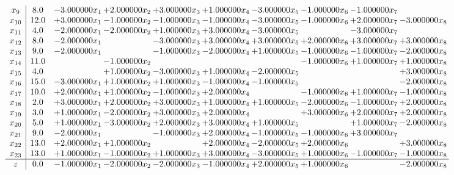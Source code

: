 \documentclass[10pt]{article}
\begin{document}
\[\begin{array}{c| c c@{\hskip 2pt} c@{\hskip 2pt} c@{\hskip 2pt} c@{\hskip 2pt} c@{\hskip 2pt} c@{\hskip 2pt} c@{\hskip 2pt} c@{\hskip 2pt} }
 x_{9}   &  8.0 & -3.000000 x_{1} & + 2.000000 x_{2} & + 3.000000 x_{3} & + 1.000000 x_{4} & -3.000000 x_{5} & -1.000000 x_{6} & -1.000000 x_{7} &   \\
 x_{10}   &  12.0 & + 3.000000 x_{1} & -1.000000 x_{2} & -1.000000 x_{3} & -1.000000 x_{4} & -3.000000 x_{5} & -1.000000 x_{6} & + 2.000000 x_{7} & -3.000000 x_{8}\\
 x_{11}   &  4.0 & -2.000000 x_{1} & -2.000000 x_{2} & + 1.000000 x_{3} & + 3.000000 x_{4} & -3.000000 x_{5} &   & -3.000000 x_{7} &   \\
 x_{12}   &  8.0 & -2.000000 x_{1} &   & -3.000000 x_{3} & + 3.000000 x_{4} & + 3.000000 x_{5} & + 2.000000 x_{6} & + 3.000000 x_{7} & + 3.000000 x_{8}\\
 x_{13}   &  9.0 & -2.000000 x_{1} &   & -1.000000 x_{3} & -2.000000 x_{4} & + 1.000000 x_{5} & -1.000000 x_{6} & -1.000000 x_{7} & -2.000000 x_{8}\\
 x_{14}   &  11.0  &   & -1.000000 x_{2} &    &    &   & -1.000000 x_{6} & + 1.000000 x_{7} & + 1.000000 x_{8}\\
 x_{15}   &  4.0  &   & + 1.000000 x_{2} & -3.000000 x_{3} & + 1.000000 x_{4} & -2.000000 x_{5} &    &   & + 3.000000 x_{8}\\
 x_{16}   &  15.0 & -3.000000 x_{1} & + 1.000000 x_{2} & + 1.000000 x_{3} & -1.000000 x_{4} & -1.000000 x_{5} &    &   & -2.000000 x_{8}\\
 x_{17}   &  10.0 & + 2.000000 x_{1} & + 1.000000 x_{2} & -1.000000 x_{3} & + 2.000000 x_{4} &   & -1.000000 x_{6} & + 1.000000 x_{7} & -1.000000 x_{8}\\
 x_{18}   &  2.0 & + 3.000000 x_{1} & + 2.000000 x_{2} & + 3.000000 x_{3} & + 1.000000 x_{4} & + 1.000000 x_{5} & -2.000000 x_{6} & -1.000000 x_{7} & + 2.000000 x_{8}\\
 x_{19}   &  3.0 & + 1.000000 x_{1} & -2.000000 x_{2} & + 3.000000 x_{3} & + 2.000000 x_{4} &   & + 3.000000 x_{6} & + 2.000000 x_{7} & + 2.000000 x_{8}\\
 x_{20}   &  5.0 & + 1.000000 x_{1} & -3.000000 x_{2} & + 2.000000 x_{3} & + 3.000000 x_{4} & + 1.000000 x_{5} &   & + 1.000000 x_{7} & -2.000000 x_{8}\\
 x_{21}   &  9.0 & -2.000000 x_{1} &   & -1.000000 x_{3} & + 2.000000 x_{4} & -1.000000 x_{5} & -1.000000 x_{6} & + 3.000000 x_{7} &   \\
 x_{22}   &  13.0 & + 2.000000 x_{1} & + 1.000000 x_{2} &   & + 2.000000 x_{4} & -2.000000 x_{5} & + 2.000000 x_{6} &   & + 3.000000 x_{8}\\
 x_{23}   &  13.0 & + 1.000000 x_{1} & -1.000000 x_{2} & + 1.000000 x_{3} & + 3.000000 x_{4} & -3.000000 x_{5} & + 1.000000 x_{6} & -1.000000 x_{7} & -1.000000 x_{8}\\
\hline
z    &  0.0 & -1.000000 x_{1} & -2.000000 x_{2} & -2.000000 x_{3} & -1.000000 x_{4} & + 2.000000 x_{5} & + 1.000000 x_{6} &   & -2.000000 x_{8}\\
\end{array}\]
\end{document}
